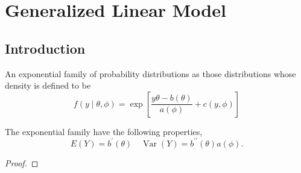 \chapter{Generalized Linear Model}

\section{Introduction}

\begin{definition} \label{def:exponential-family}
    An exponential family of probability distributions as those distributions whose density is defined to be
    \begin{equation}
        f\left(y\mid\theta,\phi\right)=\exp\left[\frac{y\theta-b(\theta)}{a(\phi)}+c(y,\phi)\right]
    \end{equation}
\end{definition}

\begin{property}
    The exponential family have the following properties,
    \begin{equation*}
        E(Y)=b^{\prime}(\theta)\quad\operatorname{Var}(Y)=b^{\prime\prime}(\theta)a(\phi).
    \end{equation*}
\end{property}

\begin{proof}

\end{proof}

